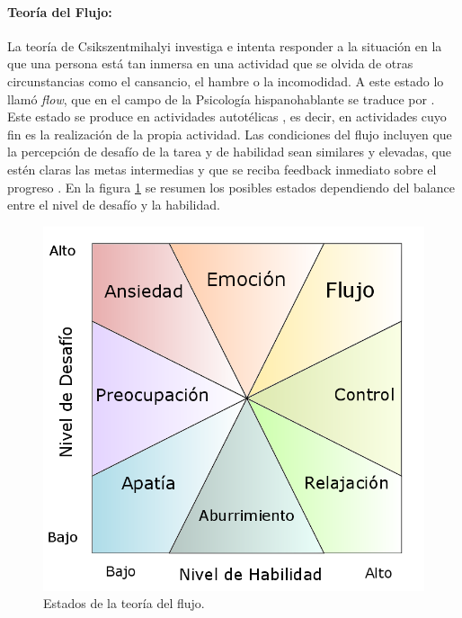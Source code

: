 \paragraph{Teoría del Flujo:} La teoría de Csikszentmihalyi investiga e intenta responder a la situación en la que una persona está tan inmersa en una actividad que se olvida de otras circunstancias como el cansancio, el hambre o la incomodidad.
%
A este estado lo llamó \textit{flow}, que en el campo de la Psicología hispanohablante se traduce por .
%
Este estado se produce en actividades autotélicas \label{autotel}, es decir, en actividades cuyo fin es la realización de la propia actividad.
%
Las condiciones del flujo incluyen que la percepción de desafío de la tarea y de habilidad sean similares y elevadas, que estén claras las metas intermedias y que se reciba feedback inmediato sobre el progreso \citep{Flow}.
%
En la figura \ref{fig::Flujo} se resumen los posibles estados dependiendo del balance entre el nivel de desafío y la habilidad.

\begin{figure}[hbt]
\begin{center}
\includegraphics[scale=0.40]{img/Flujo.png}
\caption{Estados de la teoría del flujo.}
\label{fig::Flujo}
\end{center}
\vspace{-0.5cm}
\end{figure}

